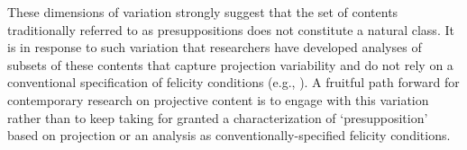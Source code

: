 \documentclass[11pt,fleqn]{article}
\newcommand{\6}{\mbox{$[\hspace*{-.6mm}[$}}
\newcommand{\9}{\mbox{$]\hspace*{-.6mm}]$}}
\newcommand{\citepos}[1]{\citeauthor{#1}'s \citeyear{#1}}
\begin{document}
These dimensions of variation strongly suggest that the set of contents traditionally referred to as presuppositions does not constitute a natural class. It is in response to such variation that researchers have developed analyses of subsets of these contents that capture projection variability and do not rely on a conventional specification of felicity conditions (e.g., \citealt{abrusan2011,abrusan2013,abrusan2016,abusch02,abusch10,romoli2015}). A fruitful path forward for contemporary research on projective content is to engage with this variation rather than to keep taking for granted a characterization of `presupposition'  based on projection or an analysis as conventionally-specified felicity conditions.


%
%
%
%
%
\end{document}
